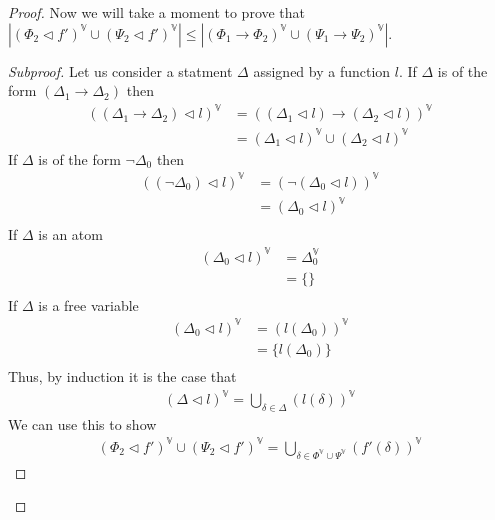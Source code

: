 \documentclass{article}
\newenvironment{subproof}{%
  \begin{proof}[Subproof]%
}{%
  \end{proof}%
}
\begin{document}
\begin{proof}
Now we will take a moment to prove that $|(\Phi_2\lhd f')^\mathbb{V}\cup(\Psi_2\lhd f')^\mathbb{V}| \leq |(\Phi_1\rightarrow\Phi_2)^\mathbb{V} \cup (\Psi_1\rightarrow\Psi_2)^\mathbb{V}|$.
\begin{subproof}
Let us consider a statment $\Delta$ assigned by a function $l$.
If $\Delta$ is of the form $(\Delta_1\rightarrow\Delta_2)$ then
\begin{align*}
((\Delta_1\rightarrow\Delta_2)\lhd l)^\mathbb{V}
&= ((\Delta_1\lhd l)\rightarrow(\Delta_2\lhd l))^\mathbb{V} \tag{Definition of Assignment} \\
&= (\Delta_1\lhd l)^\mathbb{V}\cup(\Delta_2\lhd l)^\mathbb{V} \tag{Definition of Free Variable Set}
\end{align*}
If $\Delta$ is of the form $\neg \Delta_0$ then
\begin{align*}
((\neg \Delta_0)\lhd l)^\mathbb{V}
&= (\neg (\Delta_0\lhd l))^\mathbb{V} \tag{Definition of Assignment} \\
&= (\Delta_0\lhd l)^\mathbb{V} \tag{Definition of Free Variable Set} \\
\end{align*}
If $\Delta$ is an atom
\begin{align*}
(\Delta_0\lhd l)^\mathbb{V}
&= \Delta_0^\mathbb{V} \tag{Definition of Assignment} \\
&= \{\} \tag{Definition of Free Variable Set} \\
\end{align*}
If $\Delta$ is a free variable
\begin{align*}
(\Delta_0\lhd l)^\mathbb{V}
&= (l(\Delta_0))^\mathbb{V} \tag{Definition of Assignment} \\
&= \{l(\Delta_0)\} \tag{Definition of Free Variable Set} \\
\end{align*}
Thus, by induction it is the case that 
\begin{align*}
(\Delta\lhd l)^\mathbb{V}
= \bigcup_{\delta \in \Delta} (l(\delta))^\mathbb{V}
\end{align*}
We can use this to show
\begin{align*}
(\Phi_2\lhd f')^\mathbb{V}\cup(\Psi_2\lhd f')^\mathbb{V}
= \bigcup_{\delta \in \Phi^\mathbb{V}\cup\Psi^\mathbb{V}}(f'(\delta))^\mathbb{V}
\end{align*}

\end{subproof}

\end{proof}
\end{document}
